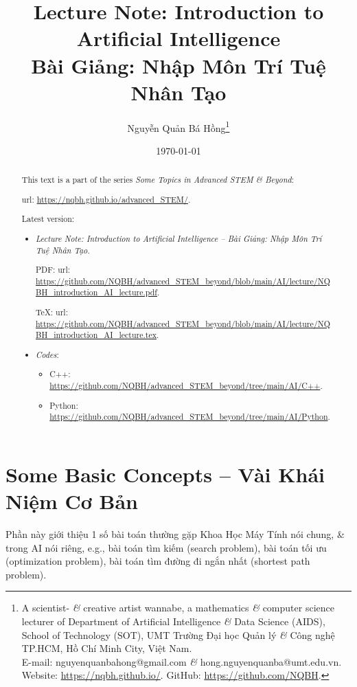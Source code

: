 \documentclass{article}
\title{Lecture Note: Introduction to Artificial Intelligence\\Bài Giảng: Nhập Môn Trí Tuệ Nhân Tạo}
\author{Nguyễn Quản Bá Hồng\footnote{A scientist- {\it\&} creative artist wannabe, a mathematics {\it\&} computer science lecturer of Department of Artificial Intelligence {\it\&} Data Science (AIDS), School of Technology (SOT), UMT Trường Đại học Quản lý {\it\&} Công nghệ TP.HCM, Hồ Chí Minh City, Việt Nam.\\E-mail: {\sf nguyenquanbahong@gmail.com} {\it\&} {\sf hong.nguyenquanba@umt.edu.vn}. Website: \url{https://nqbh.github.io/}. GitHub: \url{https://github.com/NQBH}.}}
\date{\today}
\begin{document}
\maketitle
\begin{abstract}
	This text is a part of the series {\it Some Topics in Advanced STEM \& Beyond}:
	
	{\sc url}: \url{https://nqbh.github.io/advanced_STEM/}.
	
	Latest version:
	\begin{itemize}
		\item {\it Lecture Note: Introduction to Artificial Intelligence -- Bài Giảng: Nhập Môn Trí Tuệ Nhân Tạo}.
		
		PDF: {\sc url}: \url{https://github.com/NQBH/advanced_STEM_beyond/blob/main/AI/lecture/NQBH_introduction_AI_lecture.pdf}.
		
		\TeX: {\sc url}: \url{https://github.com/NQBH/advanced_STEM_beyond/blob/main/AI/lecture/NQBH_introduction_AI_lecture.tex}.
		\item {\it Codes}:
		\begin{itemize}
			\item C++: \url{https://github.com/NQBH/advanced_STEM_beyond/tree/main/AI/C++}.
			\item Python: \url{https://github.com/NQBH/advanced_STEM_beyond/tree/main/AI/Python}.
		\end{itemize}
	\end{itemize}
\end{abstract}
\tableofcontents


\section{Some Basic Concepts -- Vài Khái Niệm Cơ Bản}
Phần này giới thiệu 1 số bài toán thường gặp Khoa Học Máy Tính nói chung, \& trong AI nói riêng, e.g., bài toán tìm kiếm (search problem), bài toán tối ưu (optimization problem), bài toán tìm đường đi ngắn nhất (shortest path problem).

\end{document}
